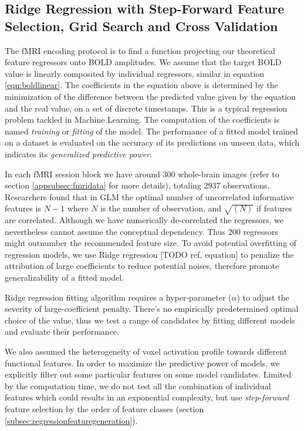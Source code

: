 \subsection{Ridge Regression with Step-Forward Feature Selection, Grid Search and Cross Validation}
The fMRI encoding protocol is to find a function projecting our theoretical feature regressors onto BOLD amplitudes. We assume that the target BOLD value is linearly composited by individual regressors, similar in equation \ref{eqn:boldlinear}. The coefficients in the equation above is determined by the minimization of the difference between the predicted value given by the equation and the real value, on a set of discrete timestamps. This is a typical regression problem tackled in Machine Learning. The computation of the coefficients is named \emph{training} or \emph{fitting} of the model. The performance of a fitted model trained on a dataset is evaluated on the accuracy of its predictions on unseen data, which indicates its \emph{generalized predictive power}.

In each fMRI session block we have around 300 whole-brain images (refer to section \ref{appsubsec:fmridata} for more details), totaling 2937 observations. Researchers \parencite{huaOptimalNumberFeatures2005} found that in GLM the optimal number of uncorrelated informative features is \(N - 1\) where \(N\) is the number of observation, and \(\sqrt{(N)}\) if features are correlated. Although we have numerically de-correlated the regressors, we nevertheless cannot assume the conceptual dependency. Thus 200 regressors might outnumber the recommended feature size. To avoid potential overfitting of regression models, we use Ridge regression [TODO ref, equation] to penalize the attribution of large coefficients to reduce potential noises, therefore promote generalizability of a fitted model.

Ridge regression fitting algorithm requires a hyper-parameter (\(\alpha\)) to adjust the severity of large-coefficient penalty. There's no empirically predetermined optimal choice of the value, thus we test a range of candidates by fitting different models and evaluate their performance. 

We also assumed the heterogeneity of voxel activation profile towards different functional features. In order to maximize the predictive power of models, we explicitly filter out some particular features on some model candidates. Limited by the computation time, we do not test all the combination of individual features which could results in an exponential complexity, but use \emph{step-forward} feature selection by the order of feature classes (section \ref{subsec:regressionfeaturegeneration}).

